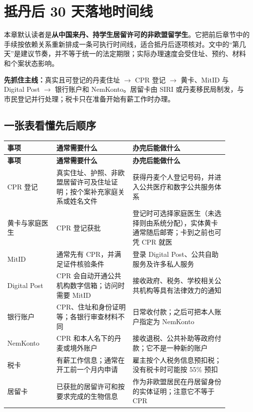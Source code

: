 
\section{抵丹后 30 天落地时间线}\label{sec:arrival30}

本章默认读者是\textbf{从中国来丹、持学生居留许可的非欧盟留学生}。它把前后章节中的手续按依赖关系重新排成一条可执行时间线，适合抵丹后逐项核对。文中的“第几天”是建议节奏，并不等于统一的法定期限；实际办理速度会受住址、预约、材料和个案状态影响。

\begin{grayleftbox}
\textbf{先抓住主线：}真实且可登记的丹麦住址 $\rightarrow$ CPR 登记 $\rightarrow$ 黄卡、MitID 与 Digital Post $\rightarrow$ 银行账户和 NemKonto。居留卡由 SIRI 或丹麦移民局制发，与市民登记并行处理；税卡只在准备开始有薪工作时办理。
\end{grayleftbox}

\subsection{一张表看懂先后顺序}

\small
{}
\begin{longtable}{p{0.20\linewidth}p{0.31\linewidth}p{0.39\linewidth}}
  \toprule
  \textbf{事项} & \textbf{通常需要什么} & \textbf{办完后能做什么} \\
  \midrule
  \endfirsthead
  \toprule
  \textbf{事项} & \textbf{通常需要什么} & \textbf{办完后能做什么} \\
  \midrule
  \endhead
  \bottomrule
  \endfoot
  CPR 登记 & 真实住址、护照、非欧盟居留许可及住址证明；按个案补充家庭关系或姓名文件 & 获得丹麦个人登记号码，并进入公共医疗和数字公共服务体系 \\
  黄卡与家庭医生 & CPR 登记获批 & 登记时可选择家庭医生（未选择则由系统分配），实体黄卡通常随后邮寄；卡到之前也可凭 CPR 就医 \\
  MitID & 通常先有 CPR，并满足证件核验条件 & 登录 Digital Post、公共自助服务及许多私人服务 \\
  Digital Post & CPR 会自动开通公共机构数字信箱；访问时需要 MitID & 接收政府、税务、学校相关公共机构等具有法律效力的通知 \\
  银行账户 & CPR、住址和身份证明等；各银行审查材料不同 & 日常收付款；之后可把本人账户指定为 NemKonto \\
  NemKonto & CPR 和本人名下的丹麦或境外账户 & 接收退税、公共补助等政府付款；它不是一种新的账户 \\
  税卡 & 有薪工作信息；通常在开工前一个月内申请 & 雇主按个人税务信息预扣税；没有税卡时可能按 55\% 预扣 \\
  居留卡 & 已获批的居留许可和按要求完成的生物信息 & 作为非欧盟居民在丹居留身份的实体证明；注意它不等于 CPR \\
\end{longtable}
\normalsize

